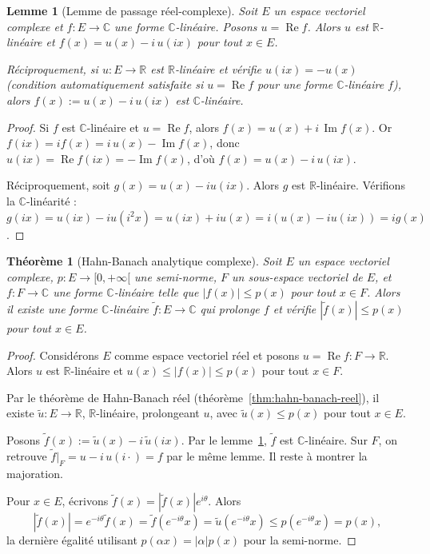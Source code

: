 \documentclass[a4paper,12pt]{book}
\newcommand{\R}{\mathbb{R}}
\newcommand{\C}{\mathbb{C}}
\newcommand{\abs}[1]{\left| #1 \right|}
\theoremstyle{definition}
\theoremstyle{plain}
\newtheorem{theoreme}[definition]{Théorème}
\newtheorem{lemme}[definition]{Lemme}
\theoremstyle{remark}
\begin{document}

\begin{lemme}[Lemme de passage réel-complexe]\label{lem:reel-complexe}
Soit $E$ un espace vectoriel complexe et $f : E \to \C$ une forme $\C$-linéaire.
Posons $u = \operatorname{Re} f$. Alors $u$ est $\R$-linéaire et
$f(x) = u(x) - i\, u(ix)$ pour tout $x \in E$.

Réciproquement, si $u : E \to \R$ est $\R$-linéaire et vérifie $u(ix) = -u(x)$
(condition automatiquement satisfaite si $u = \operatorname{Re} f$ pour une forme
$\C$-linéaire $f$), alors $f(x) := u(x) - i\, u(ix)$ est $\C$-linéaire.
\end{lemme}

\begin{proof}
Si $f$ est $\C$-linéaire et $u = \operatorname{Re} f$, alors
$f(x) = u(x) + i\, \operatorname{Im} f(x)$. Or
$f(ix) = if(x) = i\, u(x) - \operatorname{Im} f(x)$, donc
$u(ix) = \operatorname{Re} f(ix) = -\operatorname{Im} f(x)$, d'où
$f(x) = u(x) - i\, u(ix)$.

Réciproquement, soit $g(x) = u(x) - iu(ix)$. Alors $g$ est $\R$-linéaire. Vérifions
la $\C$-linéarité : $g(ix) = u(ix) - iu(i^2x) = u(ix) + iu(x) = i(u(x) - iu(ix)) = ig(x)$.
\end{proof}

\begin{theoreme}[Hahn-Banach analytique complexe]\label{thm:hahn-banach-complexe}
Soit $E$ un espace vectoriel complexe, $p : E \to [0,+\infty[$ une semi-norme, $F$
un sous-espace vectoriel de $E$, et $f : F \to \C$ une forme $\C$-linéaire telle que
$\abs{f(x)} \leq p(x)$ pour tout $x \in F$. Alors il existe une forme $\C$-linéaire
$\tilde{f} : E \to \C$ qui prolonge $f$ et vérifie
$\abs{\tilde{f}(x)} \leq p(x)$ pour tout $x \in E$.
\end{theoreme}

\begin{proof}
Considérons $E$ comme espace vectoriel réel et posons $u = \operatorname{Re} f : F \to \R$.
Alors $u$ est $\R$-linéaire et $u(x) \leq \abs{f(x)} \leq p(x)$ pour tout $x \in F$.

Par le théorème de Hahn-Banach réel (théorème~\ref{thm:hahn-banach-reel}), il existe
$\tilde{u} : E \to \R$, $\R$-linéaire, prolongeant $u$, avec $\tilde{u}(x) \leq p(x)$
pour tout $x \in E$.

Posons $\tilde{f}(x) := \tilde{u}(x) - i\,\tilde{u}(ix)$. Par le
lemme~\ref{lem:reel-complexe}, $\tilde{f}$ est $\C$-linéaire. Sur $F$, on retrouve
$\tilde{f}|_F = u - i\,u(i\cdot) = f$ par le même lemme. Il reste à montrer la
majoration.

Pour $x \in E$, écrivons $\tilde{f}(x) = \abs{\tilde{f}(x)} e^{i\theta}$. Alors
\[
    \abs{\tilde{f}(x)} = e^{-i\theta}\tilde{f}(x) = \tilde{f}(e^{-i\theta}x)
    = \tilde{u}(e^{-i\theta}x) \leq p(e^{-i\theta}x) = p(x),
\]
la dernière égalité utilisant $p(\alpha x) = \abs{\alpha}p(x)$ pour la semi-norme.
\end{proof}
\end{document}
